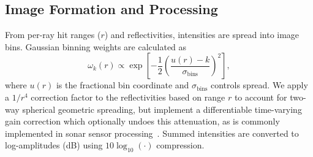 \subsection{Image Formation and Processing}
From per-ray hit ranges (\(r\)) and reflectivities, intensities are spread into image bins. Gaussian binning weights are calculated as
\vspace{-1mm}
\[
\omega_k(r)\propto \exp\!\left[-\frac{1}{2}\left(\frac{u(r)-k}{\sigma_{\text{bins}}}\right)^{\!2}\right],
\]
where $u(r)$ is the fractional bin coordinate and $\sigma_{\text{bins}}$ controls spread. We apply a \(1/r^4\) correction factor to the reflectivities based on range \(r\) to account for two-way spherical geometric spreading, but implement a differentiable time-varying gain correction which optionally undoes this attenuation, as is commonly implemented in sonar sensor processing~\cite{Maclennan1986TVG}. Summed intensities are converted to log-amplitudes (dB) using $10\log_{10}(\cdot)$ compression.